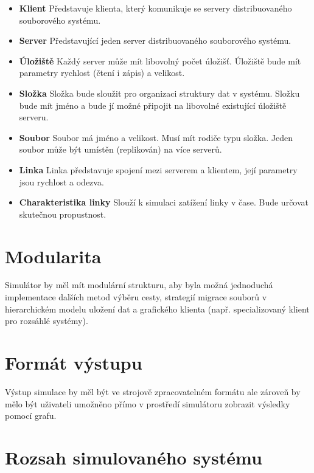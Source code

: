 \documentclass[czech,DP]{thesiskiv}
\begin{document}
\begin{itemize}

\item \textbf{Klient} Představuje klienta, který komunikuje se servery distribuovaného souborového systému.

\item \textbf{Server} Představující jeden server distribuovaného souborového systému.

\item \textbf{Úložiště} Každý server může mít libovolný počet úložišť. Úložiště bude mít parametry rychlost (čtení i zápis) a velikost.

\item \textbf{Složka} Složka bude sloužit pro organizaci struktury dat v systému. Složku bude mít jméno a bude jí možné připojit na libovolné existující úložiště serveru.

\item \textbf{Soubor} Soubor má jméno a velikost. Musí mít rodiče typu složka. Jeden soubor může být umístěn (replikován) na více serverů.

\item \textbf{Linka} Linka představuje spojení mezi serverem a klientem, její parametry jsou rychlost a odezva.

\item \textbf{Charakteristika linky} Slouží k simulaci zatížení linky v čase. Bude určovat skutečnou propustnost.

\end{itemize}

\section{Modularita}

Simulátor by měl mít modulární strukturu, aby byla možná jednoduchá implementace dalších metod výběru cesty, strategií migrace souborů v hierarchickém modelu uložení dat a grafického klienta (např. specializovaný klient pro rozsáhlé systémy).

\section{Formát výstupu}

Výstup simulace by měl být ve strojově zpracovatelném formátu ale zároveň by mělo být uživateli umožněno přímo v prostředí simulátoru zobrazit výsledky pomocí grafu.

\section{Rozsah simulovaného systému}
\end{document}
